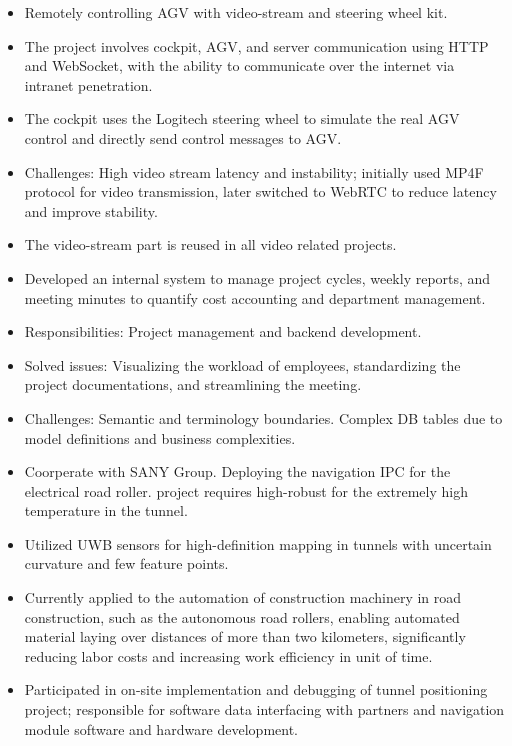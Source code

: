 \documentclass[a4paper,10pt]{resume}
\begin{document}
\begin{itemize}[parsep=0.5ex]
  \item Remotely controlling AGV with video-stream and steering wheel kit.
  \item The project involves cockpit, AGV, and server communication using HTTP and WebSocket, with the ability to communicate over the internet via intranet penetration.
  \item The cockpit uses the Logitech steering wheel to simulate the real AGV control and directly send control messages to AGV.
  \item Challenges: High video stream latency and instability; initially used MP4F protocol for video transmission, later switched to WebRTC to reduce latency and improve stability.
  \item The video-stream part is reused in all video related projects.
\end{itemize}

\begin{itemize}[parsep=0.5ex]
  \item Developed an internal system to manage project cycles, weekly reports, and meeting minutes to quantify cost accounting and department management.
  \item Responsibilities: Project management and backend development.
  \item Solved issues: Visualizing the workload of employees, standardizing the project documentations, and streamlining the meeting.
  \item Challenges: Semantic and terminology boundaries. Complex DB tables due to model definitions and business complexities.
\end{itemize}

\begin{itemize}[parsep=0.5ex]
  \item Coorperate with SANY Group. Deploying the navigation IPC for the electrical road roller. project requires high-robust for the extremely high temperature in the tunnel.
  \item Utilized UWB sensors for high-definition mapping in tunnels with uncertain curvature and few feature points.
  \item Currently applied to the automation of construction machinery in road construction, such as the autonomous road rollers, enabling automated material laying over distances of more than two kilometers, significantly reducing labor costs and increasing work efficiency in unit of time.
  \item Participated in on-site implementation and debugging of tunnel positioning project; responsible for software data interfacing with partners and navigation module software and hardware development.
\end{itemize}
\end{document}
